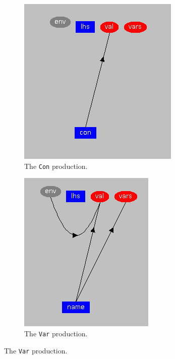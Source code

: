 \documentclass[11pt]{article}
\begin{document}
\begin{figure}[H]
  \center
  \begin{subfigure}[b]{0.45\textwidth}
    \centering
    \includegraphics[scale=0.7]{exp-con-visage}
    \caption{The \texttt{Con} production.}
    \label{exp-con-visage}
  \end{subfigure}
  \hfill
  \begin{subfigure}[b]{0.45\textwidth}
    \centering
    \includegraphics[scale=0.7]{exp-var-visage}
    \caption{The \texttt{Var} production.}
    \label{exp-var-visage}
  \end{subfigure}


\end{figure}
\end{document}
